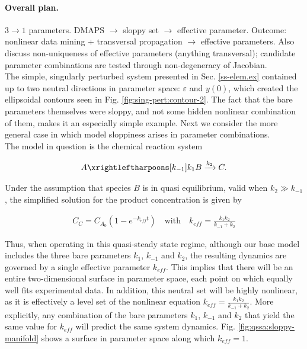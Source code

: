 \documentclass{article}
\newcommand{\eps}{\varepsilon}
\begin{document}
\paragraph{Overall plan.}
$3 \rightarrow 1$ parameters. DMAPS
$\rightarrow$ sloppy set $\rightarrow$ effective parameter. Outcome:
nonlinear data mining + transversal propagation $\rightarrow$
effective parameters.  Also discuss non-uniqueness of effective
parameters (anything transversal); candidate parameter combinations
are tested through non-degeneracy of Jacobian.\\

The simple, singularly perturbed system presented in
Sec. \ref{ss-elem.ex} contained up
to two neutral directions in parameter space: $\eps$ and $y(0)$,
which created the ellipsoidal contours seen in
Fig. \ref{fig:sing-pert:contour-2}. The fact that the bare parameters
themselves were sloppy, and not some hidden nonlinear combination
of them, makes it an especially simple example. Next we consider the
more general case in which model sloppiness arises in parameter
combinations. \\

The model in question is the chemical reaction system

\begin{align*}
  A \xrightleftharpoons[k_{-1}]{k_1} B \xrightarrow[]{k_2} C .
\end{align*}

Under the assumption that species $B$ is in quasi equilibrium, valid
when $k_2 \gg k_{-1}$, the simplified solution for the product
concentration is given by

\begin{align*}
  C_C = C_{A_0}(1 - e^{-k_{eff} t}) \quad \mathrm{with} \quad k_{eff} = \frac{k_1 k_2}{k_{-1} + k_2}
\end{align*}

Thus, when operating in this quasi-steady state regime, although our
base model includes the three bare parameters $k_1$, $k_{-1}$ and
$k_2$, the resulting dynamics are governed by a single effective
parameter $k_{eff}$. This implies that there will be an entire
two-dimensional surface in parameter space, each point on which
equally well fits experimental data. In addition, this neutral set
will be highly nonlinear, as it is effectively a level set of the
nonlinear equation $k_{eff} = \frac{k_1 k_2}{k_{-1} + k_2}$. More
explicitly, any combination of the bare parameters $k_1$, $k_{-1}$ and
$k_2$ that yield the same value for $k_{eff}$ will predict the same
system dynamics. Fig. \ref{fig:qssa:sloppy-manifold} shows a surface
in parameter space along which $k_{eff} = 1$.
\end{document}
